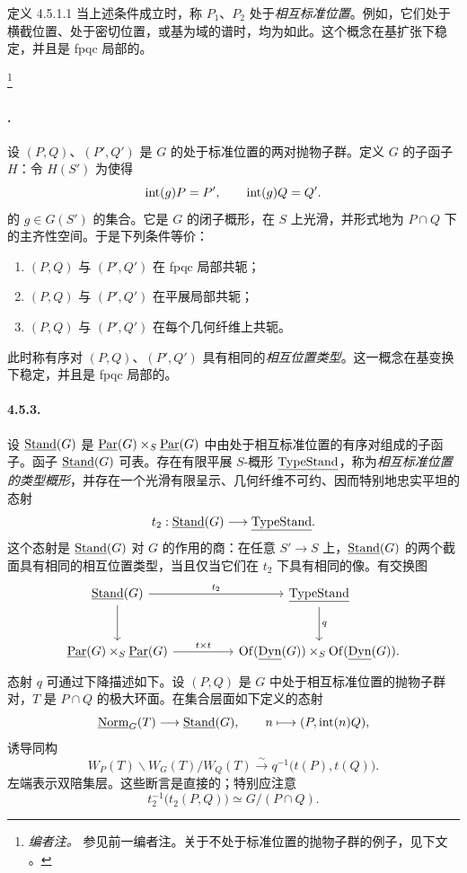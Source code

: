 \begin{sgastatement}{定义 4.5.1.1}
当上述条件成立时，称 \(P_1\)、\(P_2\) 处于\emph{相互标准位置}。例如，它们处于横截位置、处于密切位置，或基为域的谱时，均为如此。这个概念在基扩张下稳定，并且是 fpqc 局部的。
\end{sgastatement}
\footnote{\emph{编者注。} 参见前一编者注。关于不处于标准位置的抛物子群的例子，见下文 。}

\paragraph{.}
设 \((P,Q)\)、\((P',Q')\) 是 \(G\) 的处于标准位置的两对抛物子群。定义 \(G\) 的子函子 \(H\)：令 \(H(S')\) 为使得
\[
 \operatorname{int}(g)P=P',\qquad \operatorname{int}(g)Q=Q'.
\]
的 \(g\in G(S')\) 的集合。它是 \(G\) 的闭子概形，在 \(S\) 上光滑，并形式地为 \(P\cap Q\) 下的主齐性空间。于是下列条件等价：
\begin{enumerate}[label=\textup{(\roman*)}]
\item \((P,Q)\) 与 \((P',Q')\) 在 fpqc 局部共轭；
\item \((P,Q)\) 与 \((P',Q')\) 在平展局部共轭；
\item \((P,Q)\) 与 \((P',Q')\) 在每个几何纤维上共轭。
\end{enumerate}
此时称有序对 \((P,Q)\)、\((P',Q')\) 具有相同的\emph{相互位置类型}。这一概念在基变换下稳定，并且是 fpqc 局部的。

\paragraph{4.5.3.}
设 \(\underline{\operatorname{Stand}}(G)\) 是 \(\underline{\operatorname{Par}}(G)\times_S\underline{\operatorname{Par}}(G)\) 中由处于相互标准位置的有序对组成的子函子。函子 \(\underline{\operatorname{Stand}}(G)\) 可表。存在有限平展 \(S\)-概形 \(\underline{\operatorname{TypeStand}}\)，称为\emph{相互标准位置的类型概形}，并存在一个光滑有限呈示、几何纤维不可约、因而特别地忠实平坦的态射
\[
 t_2:\underline{\operatorname{Stand}}(G)\longrightarrow\underline{\operatorname{TypeStand}}.
\]
这个态射是 \(\underline{\operatorname{Stand}}(G)\) 对 \(G\) 的作用的商：在任意 \(S'\to S\) 上，\(\underline{\operatorname{Stand}}(G)\) 的两个截面具有相同的相互位置类型，当且仅当它们在 \(t_2\) 下具有相同的像。有交换图
\[
\begin{tikzcd}[column sep=huge,row sep=large]
 \Stand(G) \arrow[r,"t_2"] \arrow[d]
   & \TypeStand \arrow[d,"q"]\\
 \Par(G)\times_S\Par(G) \arrow[r,"t\times t"]
   & \Of(\underline{\operatorname{Dyn}}(G))
       \times_S\Of(\underline{\operatorname{Dyn}}(G)).
\end{tikzcd}
\]
态射 \(q\) 可通过下降描述如下。设 \((P,Q)\) 是 \(G\) 中处于相互标准位置的抛物子群对，\(T\) 是 \(P\cap Q\) 的极大环面。在集合层面如下定义的态射
\[
 \underline{\operatorname{Norm}}_G(T)\longrightarrow\underline{\operatorname{Stand}}(G),\qquad
 n\longmapsto(P,\operatorname{int}(n)Q),
\]
诱导同构
\[
 W_P(T)\backslash W_G(T)/W_Q(T)
 \xrightarrow{\sim}q^{-1}\bigl(t(P),t(Q)\bigr).
\]
左端表示双陪集层。这些断言是直接的；特别应注意
\[
 t_2^{-1}\bigl(t_2(P,Q)\bigr)\simeq G/(P\cap Q).
\]

